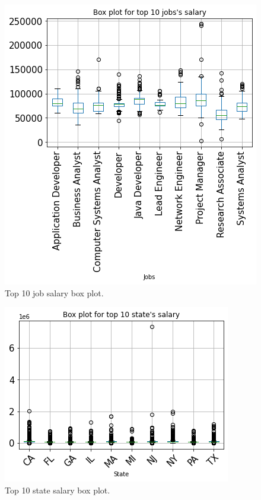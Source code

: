 \begin{figure}[h!]
	\begin{center}
		\includegraphics[width=\linewidth]{./photos/top10jobs.png}
	\end{center}
	\caption{Top 10 job salary box plot.}
	\label{top10jobbox}
\end{figure}
\begin{figure}[h!]
	\begin{center}
		\includegraphics[width=\linewidth]{./photos/top10state.png}
	\end{center}
	\caption{Top 10 state salary box plot.}
	\label{top10statebox}
\end{figure}
